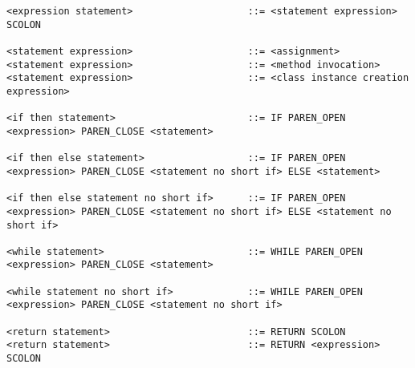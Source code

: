 \begin{lstlisting}
<expression statement>                    ::= <statement expression> SCOLON

<statement expression>                    ::= <assignment>
<statement expression>                    ::= <method invocation>
<statement expression>                    ::= <class instance creation expression>

<if then statement>                       ::= IF PAREN_OPEN <expression> PAREN_CLOSE <statement>

<if then else statement>                  ::= IF PAREN_OPEN <expression> PAREN_CLOSE <statement no short if> ELSE <statement>

<if then else statement no short if>      ::= IF PAREN_OPEN <expression> PAREN_CLOSE <statement no short if> ELSE <statement no short if>

<while statement>                         ::= WHILE PAREN_OPEN <expression> PAREN_CLOSE <statement>

<while statement no short if>             ::= WHILE PAREN_OPEN <expression> PAREN_CLOSE <statement no short if>

<return statement>                        ::= RETURN SCOLON
<return statement>                        ::= RETURN <expression> SCOLON
\end{lstlisting}

